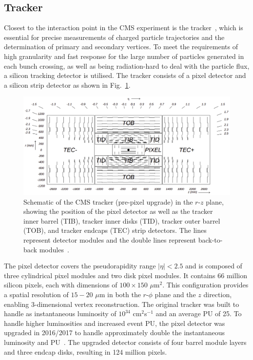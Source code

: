 \subsection{Tracker}

Closest to the interaction point in the CMS experiment is the tracker~\cite{CMS_Setup,Malberti:2014pda,CMS:2012sda}, which is essential for precise measurements of charged particle trajectories and the determination of primary and secondary vertices. 
To meet the requirements of high granularity and fast response for the large number of particles generated in each bunch crossing, as well as being radiation-hard to deal with the particle flux, a silicon tracking detector is utilised. 
The tracker consists of a pixel detector and a silicon strip detector as shown in Fig.~\ref{fig:tracker}. \\

\begin{figure}[!hbtp]
    \centering
    \includegraphics[width=\textwidth]{Figures/tracker.png}
    \caption{Schematic of the CMS tracker (pre-pixel upgrade) in the $r$-$z$ plane, showing the position of the pixel detector as well as the tracker inner barrel (TIB), tracker inner disks (TID), tracker outer barrel (TOB), and tracker endcaps (TEC) strip detectors. The lines represent detector modules and the double lines represent back-to-back modules~\cite{CMS_Setup}.}
    \label{fig:tracker}
\end{figure}

The pixel detector covers the pseudorapidity range $|\eta| < 2.5$ and is composed of three cylindrical pixel modules and two disk pixel modules. 
It contains 66 million silicon pixels, each with dimensions of $100 \times 150$ $\mu$m${^2}$. 
This configuration provides a spatial resolution of $15-20$ $\mu$m in both the $r$-$\phi$ plane and the $z$ direction, enabling 3-dimensional vertex reconstruction.
The original tracker was built to handle as instantaneous luminosity of $10^{34}$ cm$^{2}$s$^{-1}$ and an average PU of 25.
To handle higher luminosities and increased event PU, the pixel detector was upgraded in 2016/2017 to handle approximately double the instantaneous luminosity and PU~\cite{CMS:2012sda}. 
The upgraded detector consists of four barrel module layers and three endcap disks, resulting in 124 million pixels. \\


